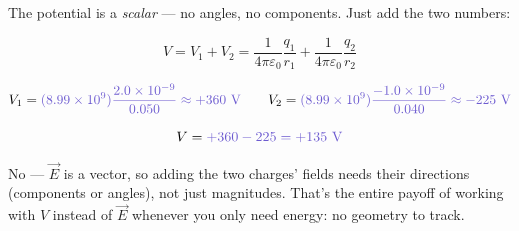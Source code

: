 \documentclass[12pt]{article}
\newcommand{\ANS}[1]{\textcolor{accent}{#1}}
\begin{document}
The potential is a \emph{scalar} --- no angles, no components. Just add the
two numbers:

\[
V = V_1 + V_2 = \dfrac{1}{4\pi\varepsilon_0}\dfrac{q_1}{r_1}
+ \dfrac{1}{4\pi\varepsilon_0}\dfrac{q_2}{r_2}
\]

\[
V_1 = \ANS{(8.99\times10^9)\dfrac{2.0\times10^{-9}}{0.050} \approx +360\text{ V}}
\qquad
V_2 = \ANS{(8.99\times10^9)\dfrac{-1.0\times10^{-9}}{0.040} \approx -225\text{ V}}
\]

\[
V = \ANS{+360 - 225 = +135\text{ V}}
\]


{\small\color{accent} No --- $\vec E$ is a vector, so adding the two
charges' fields needs their directions (components or angles), not just
magnitudes. That's the entire payoff of working with $V$ instead of $\vec
E$ whenever you only need energy: no geometry to track.}
\end{document}
